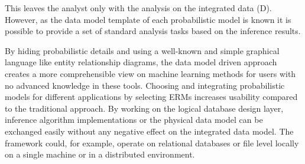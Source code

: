 This leaves the analyst only with the analysis on the integrated data (D). However, as the data model template of each probabilistic model is known it is possible to provide a set of standard analysis tasks based on the inference results.

By hiding probabilistic details and using a well-known and simple graphical language like entity relationship diagrams, the data model driven approach creates a more comprehensible view on machine learning methods for users with no advanced knowledge in these tools. Choosing and integrating probabilistic models for different applications by selecting ERMs increases usability compared to the traditional approach. By working on the logical database design layer, inference algorithm implementations or the physical data model can be exchanged easily without any negative effect on the integrated data model. The framework could, for example, operate on relational databases or file level locally on a single machine or in a distributed environment.
